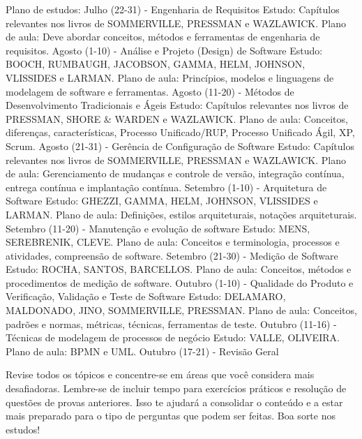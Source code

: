 Plano de estudos:
Julho (22-31) - Engenharia de Requisitos
Estudo: Capítulos relevantes nos livros de SOMMERVILLE, PRESSMAN e WAZLAWICK.
Plano de aula: Deve abordar conceitos, métodos e ferramentas de engenharia de requisitos.
Agosto (1-10) - Análise e Projeto (Design) de Software
Estudo: BOOCH, RUMBAUGH, JACOBSON, GAMMA, HELM, JOHNSON, VLISSIDES e LARMAN.
Plano de aula: Princípios, modelos e linguagens de modelagem de software e ferramentas.
Agosto (11-20) - Métodos de Desenvolvimento Tradicionais e Ágeis
Estudo: Capítulos relevantes nos livros de PRESSMAN, SHORE & WARDEN e WAZLAWICK.
Plano de aula: Conceitos, diferenças, características, Processo Unificado/RUP, Processo Unificado Ágil, XP, Scrum.
Agosto (21-31) - Gerência de Configuração de Software
Estudo: Capítulos relevantes nos livros de SOMMERVILLE, PRESSMAN e WAZLAWICK.
Plano de aula: Gerenciamento de mudanças e controle de versão, integração contínua, entrega contínua e implantação contínua.
Setembro (1-10) - Arquitetura de Software
Estudo: GHEZZI, GAMMA, HELM, JOHNSON, VLISSIDES e LARMAN.
Plano de aula: Definições, estilos arquiteturais, notações arquiteturais.
Setembro (11-20) - Manutenção e evolução de software
Estudo: MENS, SEREBRENIK, CLEVE.
Plano de aula: Conceitos e terminologia, processos e atividades, compreensão de software.
Setembro (21-30) - Medição de Software
Estudo: ROCHA, SANTOS, BARCELLOS.
Plano de aula: Conceitos, métodos e procedimentos de medição de software.
Outubro (1-10) - Qualidade do Produto e Verificação, Validação e Teste de Software
Estudo: DELAMARO, MALDONADO, JINO, SOMMERVILLE, PRESSMAN.
Plano de aula: Conceitos, padrões e normas, métricas, técnicas, ferramentas de teste.
Outubro (11-16) - Técnicas de modelagem de processos de negócio
Estudo: VALLE, OLIVEIRA.
Plano de aula: BPMN e UML.
Outubro (17-21) - Revisão Geral

Revise todos os tópicos e concentre-se em áreas que você considera mais desafiadoras.
Lembre-se de incluir tempo para exercícios práticos e resolução de questões de provas anteriores. Isso te ajudará a consolidar o conteúdo e a estar mais preparado para o tipo de perguntas que podem ser feitas. Boa sorte nos estudos!
